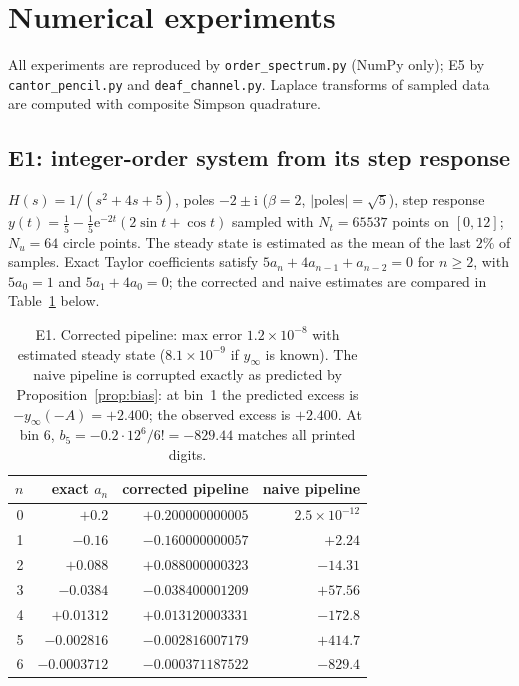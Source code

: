 \documentclass[11pt, a4paper]{article}
\theoremstyle{definition}
\theoremstyle{remark}
\newcommand{\ii}{\mathrm{i}}
\newcommand{\ee}{\mathrm{e}}
\begin{document}
\section{Numerical experiments}\label{sec:experiments}

All experiments are reproduced by \texttt{order\_spectrum.py} (NumPy only);
E5 by \texttt{cantor\_pencil.py} and \texttt{deaf\_channel.py}. Laplace
transforms of sampled data are computed with composite Simpson
quadrature.

\subsection{E1: integer-order system from its step response}

$H(s)=1/(s^{2}+4s+5)$, poles $-2\pm\ii$ ($\beta=2$,
$|\mathrm{poles}|=\sqrt5$), step response
$y(t)=\tfrac15-\tfrac15\ee^{-2t}(2\sin t+\cos t)$ sampled with
$N_t=65537$ points on $[0,12]$; $N_u=64$ circle points. The steady state is
estimated as the mean of the last $2\%$ of samples. Exact Taylor
coefficients satisfy $5a_n+4a_{n-1}+a_{n-2}=0$ for $n\ge2$, with
$5a_0=1$ and $5a_1+4a_0=0$; the corrected and naive estimates are compared
in Table~\ref{tab:E1} below.

\begin{table}[ht]
\centering\small
\begin{tabular}{rrrr}
\toprule
$n$ & exact $a_n$ & corrected pipeline & naive pipeline \\
\midrule
0 & $+0.2$        & $+0.200000000005$  & $2.5\times10^{-12}$ \\
1 & $-0.16$       & $-0.160000000057$  & $+2.24$ \\
2 & $+0.088$      & $+0.088000000323$  & $-14.31$ \\
3 & $-0.0384$     & $-0.038400001209$  & $+57.56$ \\
4 & $+0.01312$    & $+0.013120003331$  & $-172.8$ \\
5 & $-0.002816$   & $-0.002816007179$  & $+414.7$ \\
6 & $-0.0003712$  & $-0.000371187522$  & $-829.4$ \\
\bottomrule
\end{tabular}
\caption{E1. Corrected pipeline: max error $1.2\times10^{-8}$ with
estimated steady state ($8.1\times10^{-9}$ if $y_\infty$ is known). The
naive pipeline is corrupted exactly as predicted by
Proposition~\ref{prop:bias}: at bin~1 the predicted excess is
$-y_\infty(-A)=+2.400$; the observed excess is $+2.400$. At bin 6,
$b_5=-0.2\cdot12^{6}/6!=-829.44$ matches all printed digits.}
\label{tab:E1}
\end{table}
\end{document}

